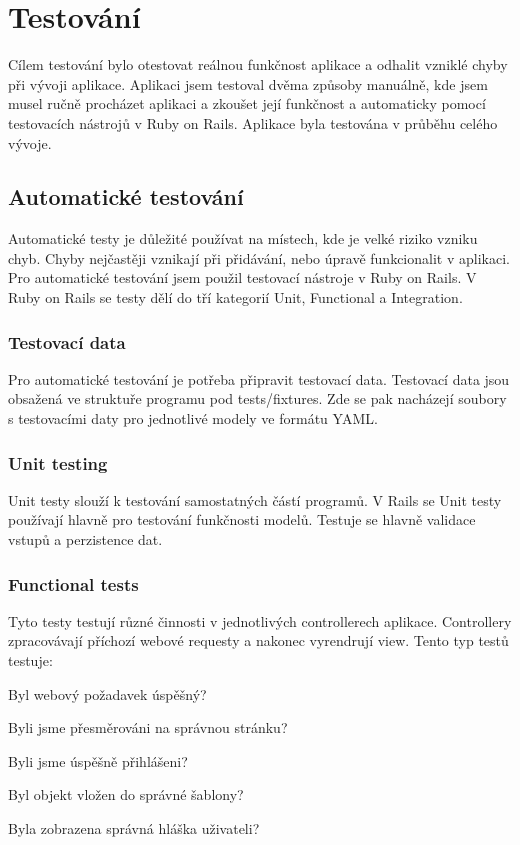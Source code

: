 \chapter{Testování}

Cílem testování bylo otestovat reálnou funkčnost aplikace a odhalit vzniklé chyby  při vývoji aplikace. Aplikaci jsem testoval dvěma způsoby manuálně, kde jsem musel ručně procházet aplikaci a zkoušet její funkčnost a automaticky pomocí testovacích nástrojů v Ruby on Rails. Aplikace byla testována v průběhu celého vývoje.

\section{Automatické testování}
Automatické testy je důležité používat na místech, kde je velké riziko vzniku chyb. Chyby nejčastěji vznikají při přidávání, nebo úpravě funkcionalit v aplikaci. Pro automatické testování jsem použil testovací nástroje v Ruby on Rails. V Ruby on Rails se testy dělí do tří kategorií  Unit, Functional a Integration.

\subsection{Testovací data}
Pro automatické testování je potřeba připravit testovací data. Testovací data jsou obsažená ve struktuře programu pod tests/fixtures. Zde se pak nacházejí soubory s testovacími daty pro jednotlivé modely ve formátu YAML.

\subsection{Unit testing}
Unit testy slouží k testování samostatných částí programů. V Rails se Unit testy používají hlavně pro testování funkčnosti modelů. Testuje se hlavně validace vstupů a perzistence dat.

\subsection{Functional tests}
Tyto testy testují různé činnosti v jednotlivých controllerech aplikace. Controllery zpracovávají příchozí webové requesty a nakonec vyrendrují view. Tento typ testů testuje:

\begin{list}{•}{}
\item Byl webový požadavek úspěšný?
\item Byli jsme přesměrováni na správnou stránku?
\item Byli jsme úspěšně přihlášeni?
\item Byl objekt vložen do správné šablony?
\item Byla zobrazena správná hláška uživateli?
\end{list} 

